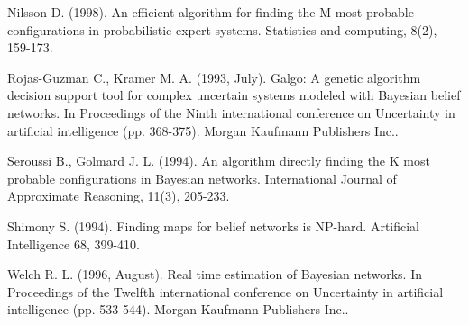 \documentclass[a4paper,11pt]{article}
\begin{document}
\begin{thebibliography}{}
Nilsson D. (1998). An efficient algorithm for finding the M most probable configurations in probabilistic expert systems. Statistics and computing, 8(2), 159-173.

Rojas-Guzman C., Kramer M. A. (1993, July). Galgo: A genetic algorithm decision support tool for complex uncertain systems modeled with Bayesian belief networks. In Proceedings of the Ninth international conference on Uncertainty in artificial intelligence (pp. 368-375). Morgan Kaufmann Publishers Inc..

Seroussi B., Golmard J. L. (1994). An algorithm directly finding the K most probable configurations in Bayesian networks. International Journal of Approximate Reasoning, 11(3), 205-233.

Shimony S. (1994). Finding maps for belief networks is NP-hard. Artificial Intelligence 68, 399-410.

Welch R. L. (1996, August). Real time estimation of Bayesian networks. In Proceedings of the Twelfth international conference on Uncertainty in artificial intelligence (pp. 533-544). Morgan Kaufmann Publishers Inc..

\end{thebibliography}
\end{document}
